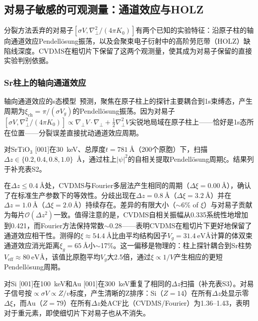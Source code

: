 \documentclass[twoside,11pt]{ctexart}
\begin{document}
\subsection{对易子敏感的可观测量：通道效应与HOLZ}\label{sec:channeling-holz}

分裂方法丢弃的对易子$[\sigma V,\nabla_\perp^2/(4\pi K_0)]$有两个已知的实验特征：沿原子柱的轴向通道效应Pendell\"osung振荡，以及会聚束电子衍射中的高阶劳厄带（HOLZ）缺陷线深度。CVDMS在粗切片下保留了这两个观测量，使其成为对易子保留的直接实验判别依据。

\subsubsection{Sr柱上的轴向通道效应}

轴向通道效应的s态模型~\cite{PennycookNellist2011,Allen2003}预测，聚焦在原子柱上的探针主要耦合到1s束缚态，产生周期为$\xi_\text{ch}=\pi/(\sigma V_g)$的Pendell\"osung振荡。因为对易子$[\sigma V,\nabla_\perp^2/(4\pi K_0)]\propto\nabla_\perp V\!\cdot\!\nabla_\perp+\tfrac12\nabla_\perp^2 V$尖锐地局域在原子柱上——恰好是1s态所在位置——分裂误差直接扰动通道效应周期。

对SrTiO$_3$ [001]在\SI{30}{\keV}、总厚度$t=\SI{781}{\angstrom}$（200个原胞）下，扫描$\Delta z\in\{0.2,0.4,0.8,1.0\}$~\AA，通过柱上$|\psi|^2$的自相关提取Pendell\"osung周期$\xi$。结果列于补充表S2。


在$\Delta z\le\SI{0.4}{\angstrom}$处，CVDMS与Fourier多层法产生相同的周期（$\Delta\xi=\SI{0.00}{\angstrom}$），确认了在标准生产参数下的等效性。分歧出现在$\Delta z=\SI{0.8}{\angstrom}$（$\Delta\xi=\SI{3.2}{\angstrom}$）并在$\Delta z=\SI{1.0}{\angstrom}$（$\Delta\xi=\SI{2.0}{\angstrom}$）持续存在。差异的有限大小（$\sim$6\% of $\xi$）与对易子贡献为每片$\mathcal O(\Delta z^2)$一致。值得注意的是，CVDMS自相关振幅从0.335系统性地增加到0.421，而Fourier方法保持常数$\sim$0.28——表明CVDMS在粗切片下更好地保留了通道效应相干性。测得的$\xi\approx\SI{54.4}{\angstrom}$比由平均结构因子$V_g=\SI{31.4}{\electronvolt\angstrom}$计算的体双束通道效应消光距离$\xi_g=\SI{65}{\angstrom}$小$\sim$17\%。这一偏移是物理的：柱上探针耦合到Sr柱势$V_\text{eff}\approx\SI{80}{\electronvolt\angstrom}$，该值比原胞平均$V_g$大2.5倍，通过$\xi\propto1/V$产生相应的更短Pendell\"osung周期。

对Si [001]在\SI{100}{\keV}和Au [001]在\SI{300}{\keV}重复了相同的$\Delta z$扫描（补充表S3）。对易子信号按$\propto\sigma V\propto Z/v$标度，产生清晰的Z排序：Si（$Z=14$）在所有$\Delta z$处显示零$\Delta\xi$，而Au（$Z=79$）在所有$\Delta z$处ACF比（CVDMS/Fourier）为1.36--1.43，表明对于重元素，即使细切片下对易子也从不消失。
\end{document}
